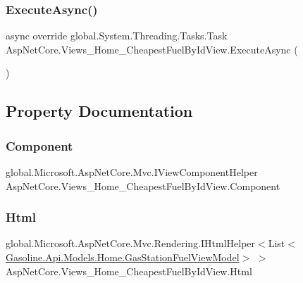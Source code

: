 \subsubsection{\texorpdfstring{ExecuteAsync()}{ExecuteAsync()}}
{\footnotesize\ttfamily async override global.\+System.\+Threading.\+Tasks.\+Task Asp\+Net\+Core.\+Views\+\_\+\+Home\+\_\+\+Cheapest\+Fuel\+By\+Id\+View.\+Execute\+Async (\begin{DoxyParamCaption}{ }\end{DoxyParamCaption})}



\subsection{Property Documentation}
\mbox{\label{class_asp_net_core_1_1_views___home___cheapest_fuel_by_id_view_af75914bc47734f02631db85222e1222d}} 
\subsubsection{\texorpdfstring{Component}{Component}}
{\footnotesize\ttfamily global.\+Microsoft.\+Asp\+Net\+Core.\+Mvc.\+I\+View\+Component\+Helper Asp\+Net\+Core.\+Views\+\_\+\+Home\+\_\+\+Cheapest\+Fuel\+By\+Id\+View.\+Component\hspace{0.3cm}{\ttfamily [get]}}

\mbox{\label{class_asp_net_core_1_1_views___home___cheapest_fuel_by_id_view_a0acc1450aecfa7d5fffec208570795c9}} 
\subsubsection{\texorpdfstring{Html}{Html}}
{\footnotesize\ttfamily global.\+Microsoft.\+Asp\+Net\+Core.\+Mvc.\+Rendering.\+I\+Html\+Helper$<$List$<$\mbox{\hyperlink{class_gasoline_1_1_api_1_1_models_1_1_home_1_1_gas_station_fuel_view_model}{Gasoline.\+Api.\+Models.\+Home.\+Gas\+Station\+Fuel\+View\+Model}}$>$ $>$ Asp\+Net\+Core.\+Views\+\_\+\+Home\+\_\+\+Cheapest\+Fuel\+By\+Id\+View.\+Html\hspace{0.3cm}{\ttfamily [get]}}

